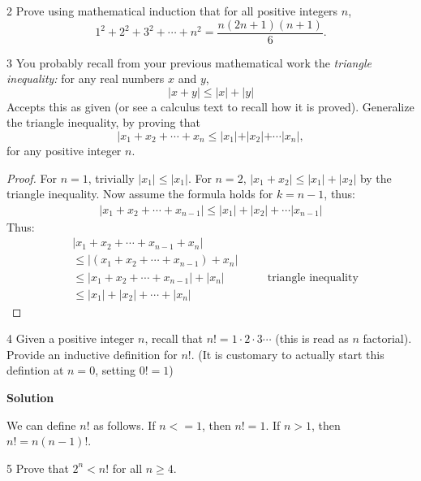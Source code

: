 \begin{problem}{2}
    Prove using mathematical induction that for all positive integers $n$,
    \[1^2 + 2^2 + 3^2 + \cdots + n^2 = \frac{n(2n + 1)(n + 1)}{6}.\]
\end{problem}
\unsolved

\begin{problem}{3}
    You probably recall from your previous mathematical work the \emph{triangle inequality:}
    for any real numbers $x$ and $y$,
    \[|x + y| \le |x| + |y|\]
    Accepts this as given (or see a calculus text to recall how it is proved).
    Generalize the triangle inequality, by proving that 
    \[|x_1 + x_2 + \cdots + x_n \le |x_1| + |x_2| + \cdots |x_n|,\]
    for any positive integer $n$.
\end{problem}
\solved

\begin{proof}
    For $n = 1$, trivially $|x_1| \le |x_1|$.
    For $n = 2$, $|x_1 + x_2| \le |x_1| + |x_2|$ by the triangle inequality.
    Now assume the formula holds for $k = n - 1$, thus:
    \begin{align*}
        |x_1 + x_2 + \cdots + x_{n - 1}| \le |x_1| + |x_2| + \cdots |x_{n - 1}|
    \end{align*}
    Thus:
    \begin{align*}
         & |x_1 + x_2 + \cdots + x_{n - 1} + x_n|        &  &                                  \\
         & \le  |(x_1 + x_2 + \cdots + x_{n - 1}) + x_n| &  &                                  \\
         & \le  |x_1 + x_2 + \cdots + x_{n - 1}| + |x_n| &  & \quad \text{triangle inequality} \\
         & \le  |x_1| + |x_2| + \cdots + |x_n|           &  & 
    \end{align*}
\end{proof}

\begin{problem}{4}
    Given a positive integer $n$, recall that $n! = 1 \cdot 2 \cdot 3 \cdots$ (this is read as 
    $n$ factorial). Provide an inductive definition for $n!$. (It  is customary to actually 
    start this defintion at $n = 0$, setting $0! = 1$) 
\end{problem}
\solved

\textbf{Solution}

We can define $n!$ as follows. If $n <=1$, then $n! = 1$. If $n > 1$, then $n!
    = n(n - 1)!$.

\begin{problem}{5}
    Prove that $2^n < n!$ for all $n \ge 4$.
\end{problem}
\solved

